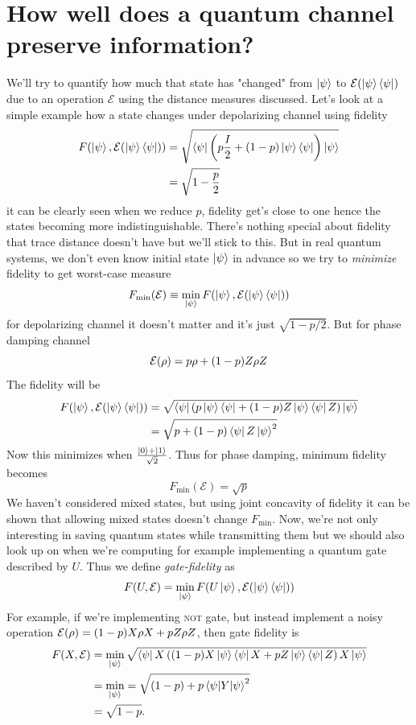 \section{How well does a quantum channel preserve information?}
We'll try to quantify how much that state has "changed" from $\ket{\psi}$ to $\operatorname{\mathcal{E}}(\ket{\psi}\bra{\psi})$ due to an operation $\mathcal{E}$ using the distance measures discussed. Let's look at a simple example how a state changes under depolarizing channel using fidelity
\begin{align}
    F(\ket{\psi}, \operatorname{\mathcal{E}}(\ket{\psi}\bra{\psi})) &= \sqrt{\bra{\psi}
    \left( p\frac{I}{2} + (1-p)\ket{\psi}\bra{\psi} \right) \ket{\psi}
    }\\
    &= \sqrt{1-\frac{p}{2}}
\end{align}
it can be clearly seen when we reduce $p$, fidelity get's close to one hence the states becoming more indistinguishable. There's nothing special about fidelity that trace distance doesn't have but we'll stick to this. But in real quantum systems, we don't even know initial state $\ket{\psi}$ in advance so we try to \textit{minimize} fidelity to get worst-case measure
\begin{equation}
    F_{\min}(\mathcal{E}) \equiv \min_{\ket{\psi}} F(\ket{\psi}, \operatorname{\mathcal{E}}(\ket{\psi}\bra{\psi}))
\end{equation}
for depolarizing channel it doesn't matter and it's just $\sqrt{1-p/2}$. But for phase damping channel
\begin{equation}
    \operatorname{\mathcal{E}}(\rho) = p\rho + (1-p)Z\rho Z
\end{equation}
The fidelity will be
\begin{align}
    F(\ket{\psi}, \operatorname{\mathcal{E}}(\ket{\psi}\bra{\psi})) &= \sqrt{\bra{\psi} \left( 
    p\ket{\psi}\bra{\psi} + (1-p)Z\ket{\psi}\bra{\psi}Z
    \right)\ket{\psi}} \\
    &= \sqrt{p + (1-p)\bra{\psi}Z\ket{\psi}^2}
\end{align}
Now this minimizes when $\frac{\ket{0}+\ket{1}}{\sqrt{2}}$. Thus for phase damping, minimum fidelity becomes
\begin{equation}
    F_{\min}(\mathcal{E}) = \sqrt{p}
\end{equation}
We haven't considered mixed states, but using joint concavity of fidelity it can be shown that allowing mixed states doesn't change $F_{\min}$. Now, we're not only interesting in saving quantum states while transmitting them but we should also look up on when we're computing for example implementing a quantum gate described by $U$. Thus we define \textit{gate-fidelity} as
\begin{equation}
    F(U, \mathcal{E}) = \min_{\ket{\psi}} F(U\ket{\psi}, \operatorname{\mathcal{E}}(\ket{\psi}\bra{\psi}))
\end{equation}
For example, if we're implementing \textsc{not} gate, but instead implement a noisy operation $\operatorname{\mathcal{E}}(\rho) = (1-p)X\rho X + pZ\rho Z$, then gate fidelity is
\begin{align}
    F(X, \mathcal{E}) &=
    \min_{\ket{\psi}} \sqrt{\bra{\psi}X
    \left( (1-p)X\ket{\psi}\bra{\psi}X + pZ\ket{\psi}\bra{\psi}Z \right)
    X\ket{\psi}} \\
    &= \min_{\ket{\psi}} = \sqrt{(1-p) + p\braket{\psi | Y | \psi}^2}
    \\ &= \sqrt{1-p}.
\end{align}

